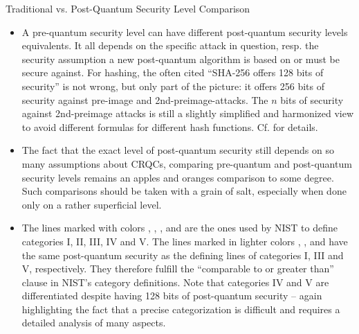 \begin{algorithmbox}{Traditional vs. Post-Quantum Security Level Comparison \tbv}
\begin{itemize}
        \item A pre-quantum security level can have different post-quantum security levels equivalents. It all depends on the specific attack in question, resp. the security assumption a new post-quantum algorithm is based on or must be secure against. For hashing, the often cited ``SHA-256 offers 128 bits of security'' is not wrong, but only part of the picture: it offers 256 bits of security against pre-image and 2nd-preimage-attacks. The $n$ bits of security against 2nd-preimage attacks is still a slightly simplified and harmonized view to avoid different formulas for different hash functions. Cf.  for details.
        \item The fact that the exact level of post-quantum security still depends on so many assumptions about CRQCs, comparing pre-quantum and post-quantum security levels remains an apples and oranges comparison to some degree. Such comparisons should be taken with a grain of salt, especially when done only on a rather superficial level.
        \item The lines marked with colors \textcolor{themered!50!black}{\blacksquare}, \textcolor{themered}{\blacksquare}, \textcolor{themeorange}{\blacksquare}, \textcolor{themeyellow}{\blacksquare} and \textcolor{themegreen!50}{\blacksquare}
        are the ones used by NIST to define categories I, II, III, IV and V. The lines marked in lighter colors
        \textcolor{themered!50!black!50}{\blacksquare}, \textcolor{themeorange!35}{\blacksquare}, and \textcolor{themegreen}{\blacksquare} have the same post-quantum security as the defining lines of categories I, III and V, respectively. They therefore fulfill the ``comparable to or greater than'' clause in NIST's category definitions. Note that categories IV and V are differentiated despite having 128 bits of post-quantum security -- again highlighting the fact that a precise categorization is difficult and requires a detailed analysis of many aspects.
    \end{itemize}
\end{algorithmbox}




